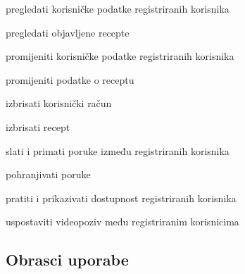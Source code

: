 \begin{packed_enum}
				\item{}
				\begin{packed_enum}
					\item pregledati korisničke podatke registriranih korisnika
					\item pregledati objavljene recepte
					\item promijeniti korisničke podatke registriranih korisnika
					\item promijeniti podatke o receptu
					\item izbrisati korisnički račun
					\item izbrisati recept
				\end{packed_enum}

				\item{}
				\begin{packed_enum}
					\item slati i primati poruke između registriranih korisnika
					\item pohranjivati poruke
					\item pratiti i prikazivati dostupnost registriranih korisnika
					\item uspostaviti videopoziv među registriranim korisnicima
				\end{packed_enum}
			
			\end{packed_enum}
			
			\eject 
			
			
				
			\subsection{Obrasci uporabe}

